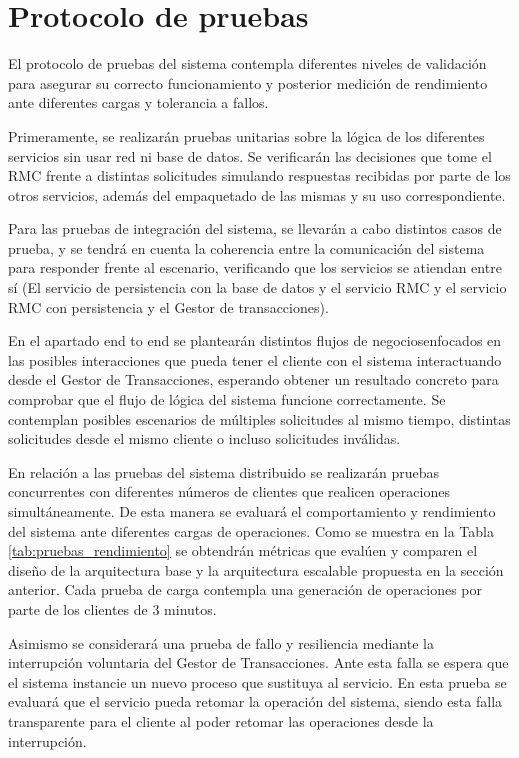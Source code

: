\documentclass[conference]{IEEEtran}
\begin{document}
\section{Protocolo de pruebas}

El protocolo de pruebas del sistema contempla diferentes niveles de validación para asegurar su correcto
funcionamiento y posterior medición de rendimiento ante diferentes cargas y tolerancia a fallos.

Primeramente, se realizarán pruebas unitarias sobre la lógica de los diferentes servicios sin usar red ni base de datos.
Se verificarán las decisiones que tome el RMC frente a distintas solicitudes simulando respuestas recibidas por parte de
los otros servicios, además del empaquetado de las mismas y su uso correspondiente.

Para las pruebas de integración del sistema, se llevarán a cabo distintos casos de prueba, y se tendrá en cuenta la coherencia entre
la comunicación del sistema para responder frente al escenario, verificando que los servicios se atiendan entre sí (El servicio de persistencia
con la base de datos y el servicio RMC y el servicio RMC con persistencia y el Gestor de transacciones).

En el apartado end to end se plantearán distintos flujos de negociosenfocados en las posibles interacciones que pueda tener el cliente
con el sistema interactuando desde el Gestor de Transacciones, esperando obtener un resultado concreto para comprobar que el flujo de
lógica del sistema funcione correctamente. Se contemplan posibles escenarios de múltiples solicitudes al mismo tiempo, distintas
solicitudes desde el mismo cliente o incluso solicitudes inválidas.

En relación a las pruebas del sistema distribuido se realizarán pruebas concurrentes con diferentes números de clientes
que realicen operaciones simultáneamente. De esta manera se evaluará el comportamiento y rendimiento
del sistema ante diferentes cargas de operaciones. Como se muestra en la Tabla \ref{tab:pruebas_rendimiento}
se obtendrán métricas que evalúen y comparen el diseño de la arquitectura base y la arquitectura escalable
propuesta en la sección anterior. Cada prueba de carga contempla una generación de operaciones por parte de los clientes
de 3 minutos.

Asimismo se considerará una prueba de fallo y resiliencia mediante la interrupción voluntaria del Gestor de Transacciones.
Ante esta falla se espera que el sistema instancie un nuevo proceso que sustituya al servicio.
En esta prueba se evaluará que el servicio pueda retomar la operación del sistema, siendo esta falla transparente para el cliente
al poder retomar las operaciones desde la interrupción.
\end{document}

